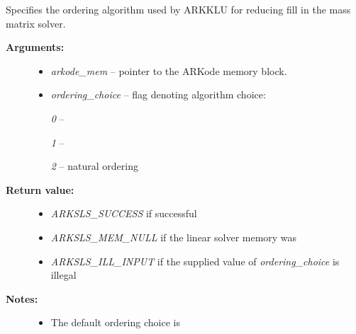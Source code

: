 \documentclass[letterpaper,10pt,english]{sphinxmanual}
\begin{document}
\begin{fulllineitems}
\label{c_interface/User_callable:c.ARKMassKLUSetOrdering}
Specifies the ordering algorithm used by ARKKLU for reducing fill
in the mass matrix solver.
\begin{description}
\item[{\textbf{Arguments:}}] \leavevmode\begin{itemize}
\item {} 
\emph{arkode\_mem} -- pointer to the ARKode memory block.

\item {} 
\emph{ordering\_choice} -- flag denoting algorithm choice:

\emph{0} -- 

\emph{1} -- 

\emph{2} -- natural ordering

\end{itemize}

\item[{\textbf{Return value:}}] \leavevmode\begin{itemize}
\item {} 
\emph{ARKSLS\_SUCCESS}  if successful

\item {} 
\emph{ARKSLS\_MEM\_NULL} if the linear solver memory was 

\item {} 
\emph{ARKSLS\_ILL\_INPUT} if the supplied value of \emph{ordering\_choice} is illegal

\end{itemize}

\item[{\textbf{Notes:}}] \leavevmode\begin{itemize}
\item {} 
The default ordering choice is 

\end{itemize}

\end{description}

\end{fulllineitems}

\end{document}
